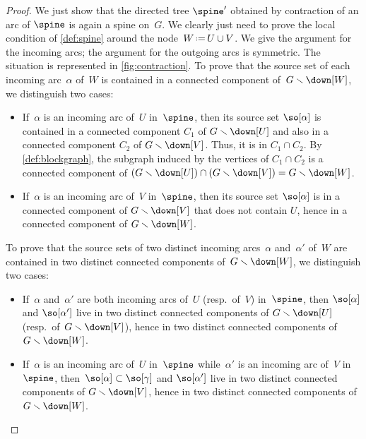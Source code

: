 \documentclass{amsart}
\theoremstyle{definition}
\newcommand{\ssm}{\smallsetminus} %
\newcommand{\eqdef}{\mbox{\,\raisebox{0.2ex}{\scriptsize\ensuremath{\mathrm:}}\ensuremath{=}\,}} %
\begin{document}
\begin{proof} 
  We just show that the directed tree $\spine'$ obtained by contraction of an arc of $\spine$ is again a spine on~$G$.
  We clearly just need to prove the local condition of \cref{def:spine} around the node~$W \eqdef U \cup V$.
  We give the argument for the incoming arcs; the argument for the outgoing arcs is symmetric. 
  The situation is represented in \cref{fig:contraction}.
  To prove that the source set of each incoming arc~$\alpha$ of~$W$ is contained in a connected component of~$G \ssm \down[W]$, we distinguish two cases:
  \begin{itemize}
    \item If~$\alpha$ is an incoming arc of~$U$ in~$\spine$, then its source set $\so[\alpha]$ is contained in a connected component $C_1$ of $G \ssm \down[U]$ and also in a connected component $C_2$ of $G \ssm \down[V]$. Thus, it is in $C_1 \cap C_2$. By \cref{def:blockgraph}, the subgraph induced by the vertices of $C_1 \cap C_2$ is a connected component of $(G \ssm \down[U]) \cap (G \ssm \down[V]) = G \ssm \down[W]$.
    \item If~$\alpha$ is an incoming arc of~$V$ in~$\spine$, then its source set $\so[\alpha]$ is in a connected component of $G \ssm \down[V]$ that does not contain $U$, hence in a connected component of $G \ssm \down[W]$.
  \end{itemize}
  To prove that the source sets of two distinct incoming arcs~$\alpha$ and~$\alpha'$ of~$W$ are contained in two distinct connected components of~$G \ssm \down[W]$, we distinguish two cases:
  \begin{itemize}
    \item If~$\alpha$ and~$\alpha'$ are both incoming arcs of~$U$ (resp.~of~$V$) in~$\spine$, then $\so[\alpha]$ and $\so[\alpha']$ live in two distinct connected components of $G \ssm \down[U]$ (resp.~of~$G \ssm \down[V]$), hence in two distinct connected components of $G\ssm \down[W]$.
    \item If~$\alpha$ is an incoming arc of~$U$ in~$\spine$ while~$\alpha'$ is an incoming arc of~$V$ in~$\spine$, then~$\so[\alpha] \subset \so[\gamma]$ and $\so[\alpha']$ live in two distinct connected components of $G \ssm \down[V]$, hence in two distinct connected components of $G\ssm \down[W]$.
    \qedhere
  \end{itemize}
\end{proof}
\end{document}
